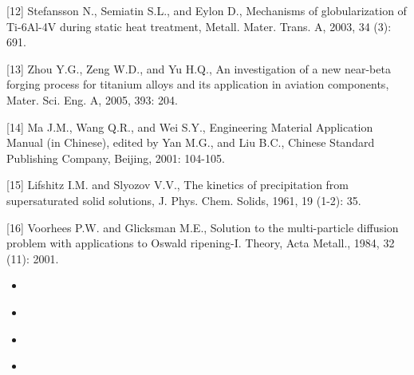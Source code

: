 \documentclass[10pt]{article}
\begin{document}
[12] Stefansson N., Semiatin S.L., and Eylon D., Mechanisms of globularization of Ti-6Al-4V during static heat treatment, Metall. Mater. Trans. A, 2003, 34 (3): 691.

[13] Zhou Y.G., Zeng W.D., and Yu H.Q., An investigation of a new near-beta forging process for titanium alloys and its application in aviation components, Mater. Sci. Eng. A, 2005, 393: 204.

[14] Ma J.M., Wang Q.R., and Wei S.Y., Engineering Material Application Manual (in Chinese), edited by Yan M.G., and Liu B.C., Chinese Standard Publishing Company, Beijing, 2001: 104-105.

[15] Lifshitz I.M. and Slyozov V.V., The kinetics of precipitation from supersaturated solid solutions, J. Phys. Chem. Solids, 1961, 19 (1-2): 35.

[16] Voorhees P.W. and Glicksman M.E., Solution to the multi-particle diffusion problem with applications to Oswald ripening-I. Theory, Acta Metall., 1984, 32 (11): 2001.

\begin{itemize}
  \item 
\end{itemize}

\begin{itemize}
  \item 
\end{itemize}

\begin{itemize}
  \item 
\end{itemize}

\begin{itemize}
  \item 
\end{itemize}
\end{document}
